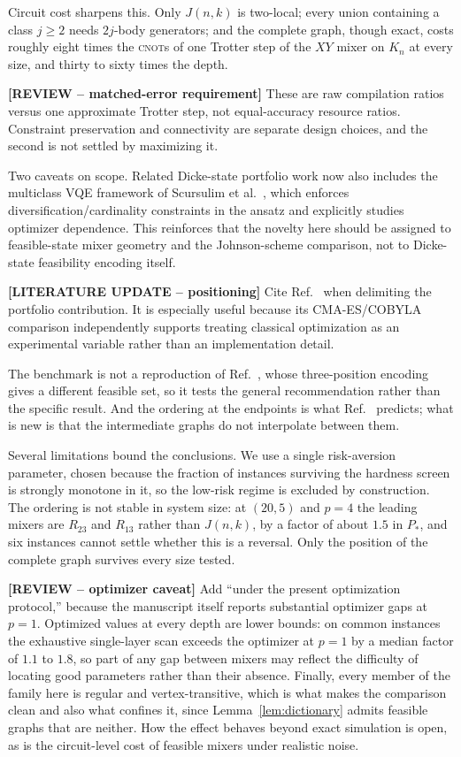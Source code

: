 Circuit cost sharpens this. Only $J(n,k)$ is two-local; every union
containing a class $j\ge2$ needs $2j$-body generators; and the complete
graph, though exact, costs roughly eight times the \textsc{cnot}s of one
Trotter step of the $XY$ mixer on $K_n$ at every size, and thirty to sixty
times the depth.

{\color{red}\textbf{[REVIEW -- matched-error requirement]} These are raw compilation ratios versus one approximate Trotter step, not equal-accuracy resource ratios.} Constraint preservation and connectivity are separate
design choices, and the second is not settled by maximizing it.

Two caveats on scope. Related Dicke-state portfolio work now also includes the multiclass VQE framework of Scursulim et al.~\cite{Scursulim2026}, which enforces diversification/cardinality constraints in the ansatz and explicitly studies optimizer dependence. This reinforces that the novelty here should be assigned to feasible-state mixer geometry and the Johnson-scheme comparison, not to Dicke-state feasibility encoding itself.

{\color{red}\textbf{[LITERATURE UPDATE -- positioning]} Cite Ref.~\cite{Scursulim2026} when delimiting the portfolio contribution. It is especially useful because its CMA-ES/COBYLA comparison independently supports treating classical optimization as an experimental variable rather than an implementation detail.}

The benchmark is not a reproduction of
Ref.~\cite{Slate2021}, whose three-position encoding gives a different
feasible set, so it tests the general recommendation rather than the
specific result. And the ordering at the endpoints is what
Ref.~\cite{Bridi2024} predicts; what is new is that the intermediate graphs
do not interpolate between them.

Several limitations bound the conclusions. We use a single risk-aversion
parameter, chosen because the fraction of instances surviving the hardness
screen is strongly monotone in it, so the low-risk regime is excluded by
construction. The ordering is not stable in system size: at $(20,5)$ and
$p=4$ the leading mixers are $R_{23}$ and $R_{13}$ rather than $J(n,k)$, by
a factor of about $1.5$ in $P_*$, and six instances cannot settle whether
this is a reversal. Only the position of the complete graph survives every
size tested.

{\color{red}\textbf{[REVIEW -- optimizer caveat]} Add ``under the present optimization protocol,'' because the manuscript itself reports substantial optimizer gaps at $p=1$.} Optimized values at every depth are lower bounds: on common
instances the exhaustive single-layer scan exceeds the optimizer at $p=1$
by a median factor of $1.1$ to $1.8$, so part of any gap between mixers may
reflect the difficulty of locating good parameters rather than their
absence. Finally, every member of the family here is regular and
vertex-transitive, which is what makes the comparison clean and also what
confines it, since Lemma~\ref{lem:dictionary} admits feasible graphs that
are neither. How the effect behaves beyond exact simulation is open, as is
the circuit-level cost of feasible mixers under realistic noise.

